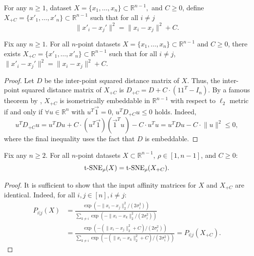 \begin{definition}
   For any $n \geq 1$, dataset $X = \{x_1, \dots, x_n\} \subset \mathbb{R}^{n-1},$ and $C \geq 0$, define ${X_{+C} = \{x'_1, \dots, x'_n\} \subset \mathbb{R}^{n-1}}$ such that for all $i\neq j$ 
   $$\lVert x'_i-x_j' \rVert^2 = \lVert x_i-x_j \rVert^2 + C.$$
\end{definition}

\begin{lemma}\label{lem:X+C_exists}
    Fix any $n \geq 1$. For all $n$-point datasets $X = \{x_1, \dots, x_n\} \subset \mathbb{R}^{n-1}$ and $C \geq 0$, there exists $X_{+C} = \{x'_1, \dots, x'_n\} \subset \mathbb{R}^{n-1}$ such that for all $i\neq j$, $\lVert x'_i-x_j' \rVert^2 = \lVert x_i-x_j \rVert^2 + C$.
\end{lemma}
\begin{proof}
    Let $D$ be the inter-point squared distance matrix of $X$. Thus, the inter-point squared distance matrix of $X_{+C}$ is $D_{+C} = D + C\cdot (11^T-I_{n})$. By a famous theorem by \citet{schoenberg1938metric}, $X_{+C}$ is isometrically embeddable in $\mathbb{R}^{n-1}$ with respect to $\ell_2$ metric if and only if $\forall u \in \mathbb{R}^n$ with $u^T \vec{1} = 0$, $u^T D_{+C} u \leq 0$ holds. Indeed,
    $$u^T D_{+C} u = u^T D u + C\cdot(u^T\vec{1})(\vec{1}^T u) - C \cdot u^T u = u^T D u - C \cdot \lVert u \rVert^2 \leq 0,$$
    where the final inequality uses the fact that $D$ is embeddable.
\end{proof}

\begin{lemma}\label{lem:tSNE_additive_invariance}
    Fix any $n \geq 2$. For all $n$-point datasets $X \subset \mathbb{R}^{n-1}$, $\rho \in [1, n-1]$, and $C \geq 0$:
    $${\operatorname*{t-SNE}}_\rho(X) = {\operatorname*{t-SNE}}_\rho(X_{+C}).$$
\end{lemma}
\begin{proof}
    It is sufficient to show that the input affinity matrices for $X$ and $X_{+C}$ are identical. Indeed, for all $i,j \in [n], i\neq j$:
    \begin{align*}
        P_{i|j}(X) &= \frac{\exp\left(-\lVert x_i - x_j \rVert^2_2 / (2\sigma_i^2)\right)}{\sum_{k \neq i} \exp\left(-\lVert x_i - x_k \rVert^2_2 / (2\sigma_i^2)\right)} \\
        &= \frac{\exp\left(-(\lVert x_i - x_j \rVert^2_2+C) / (2\sigma_i^2)\right)}{\sum_{k \neq i} \exp\left(-(\lVert x_i - x_k \rVert^2_2+C) / (2\sigma_i^2)\right)} = P_{i|j}(X_{+C}).
    \end{align*}
\end{proof}



